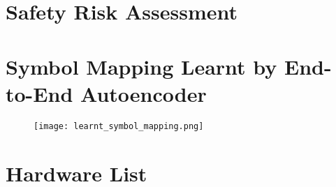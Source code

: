 
\section{Safety Risk Assessment}
\label{app:safety_risk_assessment}

	


\section{Symbol Mapping Learnt by End-to-End Autoencoder}
\label{app:learnt_symbol_mapping}

\begin{figure}[H]
	\centering
	\texttt{[image: learnt\_symbol\_mapping.png]}
	\caption{}
	\label{fig:learnt_symbol_mapping}	
\end{figure}

\section{Hardware List}
\label{app:hardware_list}

